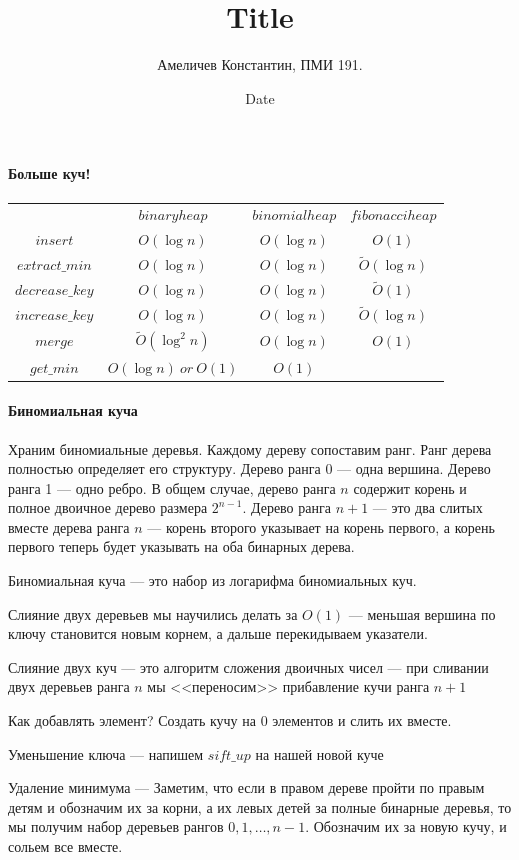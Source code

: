 \documentclass[12pt]{article}
\title{Title}
\author{Амеличев Константин, ПМИ 191.}
\date{Date}
\begin{document}
\paragraph{Больше куч!}

\begin{center}
\begin{tabular}{c|c|c|c}
&$binary heap$ & $binomial heap$ & $fibonacci heap$ \\
$insert$ & $O(\log n)$ & $O(\log n)$ & $O(1)$\\
$extract\_min$ & $O(\log n)$ & $O(\log n)$ & $\tilde O(\log n)$\\
$decrease\_key$ & $O(\log n)$ & $O(\log n)$ & $\tilde O(1)$\\
$increase\_key$ & $O(\log n)$ & $O(\log n)$ & $\tilde O(\log n)$\\
$merge$ & $\tilde O(\log^2 n)$ & $O(\log n)$& $O(1)$\\
$get\_min$ & $O(\log n)\ or\ O(1)$ & $O(1)$ 
\end{tabular}
\end{center}

\paragraph{Биномиальная куча}
\hspace{\fill}

Храним биномиальные деревья. Каждому дереву сопоставим ранг. Ранг дерева полностью определяет его структуру. Дерево ранга 0 --- одна вершина. Дерево ранга 1 --- одно ребро. В общем случае, дерево ранга $n$ содержит корень и полное двоичное дерево размера $2^{n-1}$. Дерево ранга $n+1$ --- это два слитых вместе дерева ранга $n$ --- корень второго указывает на корень первого, а корень первого теперь будет указывать на оба бинарных дерева.

Биномиальная куча --- это набор из логарифма биномиальных куч.

Слияние двух деревьев мы научились делать за $O(1)$ --- меньшая вершина по ключу становится новым корнем, а дальше перекидываем указатели.

Слияние двух куч --- это алгоритм сложения двоичных чисел --- при сливании двух деревьев ранга $n$ мы <<переносим>> прибавление кучи ранга $n+1$

Как добавлять элемент? Создать кучу на 0 элементов и слить их вместе.

Уменьшение ключа --- напишем $sift\_up$ на нашей новой куче

Удаление минимума --- Заметим, что если в правом дереве пройти по правым детям и обозначим их за корни, а их левых детей за полные бинарные деревья, то мы получим набор деревьев рангов $0, 1, \dots, n - 1$. Обозначим их за новую кучу, и сольем все вместе.
\end{document}
